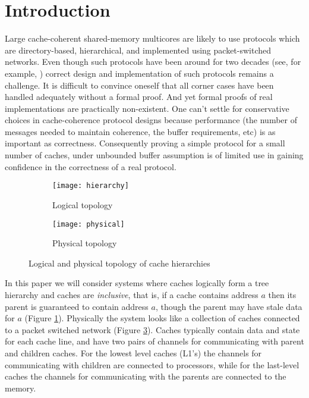 \section{Introduction} 

Large cache-coherent shared-memory multicores are likely to use protocols which
are directory-based, hierarchical, and implemented using packet-switched networks.  Even
though such protocols have been around for two decades (see, for example,
\cite{DASH, Anant, c1, c2, c3, c4, c5}) correct design and implementation of
such protocols remains a challenge. It is difficult to convince oneself that
all corner cases have been handled adequately without a formal proof. And yet
formal proofs of real implementations are practically non-existent. One can't
settle for conservative choices in cache-coherence protocol designs because
performance (\eg the number of messages needed to maintain coherence, the
buffer requirements, etc) is as important as correctness. Consequently proving
a simple protocol for a small number of caches, under unbounded buffer
assumption is of limited use in gaining confidence in the correctness of a real
protocol. 

\begin{figure}
\centering
\begin{subfigure}{.45\linewidth}
\centering
\texttt{[image: hierarchy]}
\caption{Logical topology}
\label{hierarchy}
\end{subfigure}
\begin{subfigure}{.45\linewidth}
\centering
\texttt{[image: physical]}
\caption{Physical topology}
\label{physical}
\end{subfigure}
\caption{Logical and physical topology of cache hierarchies}
\end{figure}

In this paper we will consider systems where caches logically form a tree
hierarchy and caches are \emph{inclusive}, that is, if a cache contains address
$a$ then its parent is guaranteed to contain address $a$, though the parent may
have stale data for $a$ (Figure \ref{hierarchy}). Physically the system looks
like a collection of caches connected to a packet switched network (Figure
\ref{physical}). Caches typically contain data and state for each cache line,
and have two pairs of channels for communicating with parent and children
caches. For the lowest level caches (L1's) the channels for communicating with
children are connected to processors, while for the last-level caches the
channels for communicating with the parents are connected to the memory. 

